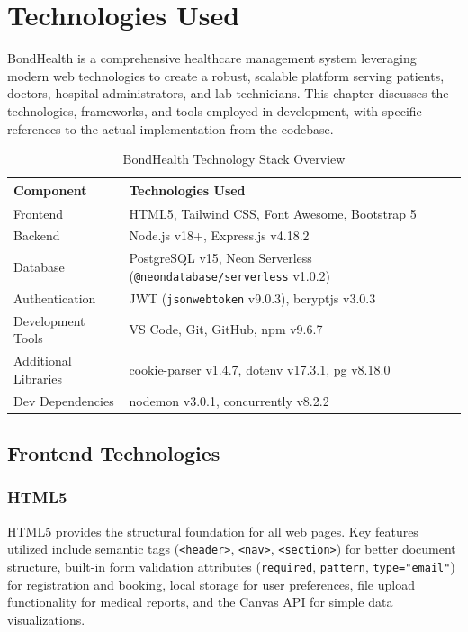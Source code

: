 \chapter{Technologies Used}

\justifying
\noindent BondHealth is a comprehensive healthcare management system leveraging modern web technologies to create a robust, scalable platform serving patients, doctors, hospital administrators, and lab technicians. This chapter discusses the technologies, frameworks, and tools employed in development, with specific references to the actual implementation from the codebase.

\begin{table}[H]
\centering
\begin{tabular}{|l|p{10cm}|}
\hline
\textbf{Component} & \textbf{Technologies Used} \\
\hline
Frontend & HTML5, Tailwind CSS, Font Awesome, Bootstrap 5 \\
\hline
Backend & Node.js v18+, Express.js v4.18.2 \\
\hline
Database & PostgreSQL v15, Neon Serverless (\texttt{@neondatabase/serverless} v1.0.2) \\
\hline
Authentication & JWT (\texttt{jsonwebtoken} v9.0.3), bcryptjs v3.0.3 \\
\hline
Development Tools & VS Code, Git, GitHub, npm v9.6.7 \\
\hline
Additional Libraries & cookie-parser v1.4.7, dotenv v17.3.1, pg v8.18.0 \\
\hline
Dev Dependencies & nodemon v3.0.1, concurrently v8.2.2 \\
\hline
\end{tabular}
\caption{BondHealth Technology Stack Overview}
\label{tab:tech-stack}
\end{table}

\section{Frontend Technologies}

\subsection{HTML5}

\justifying
\noindent HTML5 provides the structural foundation for all web pages. Key features utilized include semantic tags (\texttt{<header>}, \texttt{<nav>}, \texttt{<section>}) for better document structure, built-in form validation attributes (\texttt{required}, \texttt{pattern}, \texttt{type="email"}) for registration and booking, local storage for user preferences, file upload functionality for medical reports, and the Canvas API for simple data visualizations.

